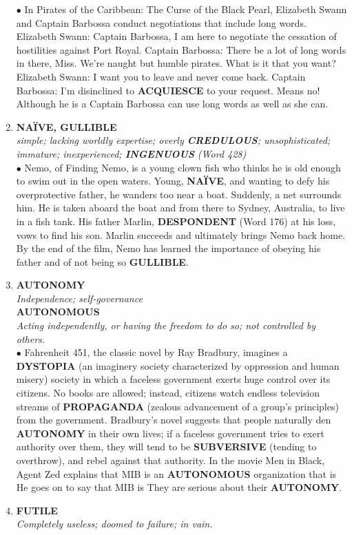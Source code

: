 \documentclass{book}
\begin{document}
\begin{enumerate}
$\bullet$ In Pirates of the Caribbean: The Curse of the Black Pearl, Elizabeth Swann and Captain Barbossa conduct negotiations that include long words. Elizabeth Swann: Captain Barbossa, I am here to negotiate the cessation of hostilities against Port Royal. Captain Barbossa: There be a lot of long words in there, Miss. We're naught but humble pirates. What is it that you want? Elizabeth Swann: I want you to leave and never come back. Captain Barbossa: I'm disinclined to \textbf{ACQUIESCE} to your request. Means no!  Although he is a  Captain Barbossa can use long words as well as she can.

\item \textbf{NAÏVE, GULLIBLE}\\ 
\textit{simple; lacking worldly expertise; overly \textbf{CREDULOUS}; unsophisticated; immature; inexperienced; \textbf{INGENUOUS} (Word 428)}\\  

$\bullet$ Nemo, of Finding Nemo, is a young clown fish who thinks he is old enough to swim out in the open waters. Young, \textbf{NAÏVE}, and wanting to defy his overprotective father, he wanders too near a boat. Suddenly, a net surrounds him. He is taken aboard the boat and from there to Sydney, Australia, to live in a fish tank. His father Marlin, \textbf{DESPONDENT} (Word 176) at his loss, vows to find his son. Marlin succeeds and ultimately brings Nemo back home. By the end of the film, Nemo has learned the importance of obeying his father and of not being so \textbf{GULLIBLE}.

\item \textbf{AUTONOMY}\\ \textit{Independence; self-governance} \\ \textbf{AUTONOMOUS}\\ \textit{Acting independently, or having the freedom to do so; not controlled by others.}\\ 

$\bullet$ Fahrenheit 451, the classic novel by Ray Bradbury, imagines a \textbf{DYSTOPIA} (an imaginery society characterized by oppression and human misery) society in which a faceless government exerts huge control over its citizens. No books are allowed; instead, citizens watch endless television streams of \textbf{PROPAGANDA} (zealous advancement of a group's principles) from the government. Bradbury's novel suggests that people naturally den \textbf{AUTONOMY} in their own lives; if a faceless government tries to exert authority over them, they will tend to be \textbf{SUBVERSIVE} (tending to overthrow), and rebel against that authority. In the movie Men in Black, Agent Zed explains that MIB is an \textbf{AUTONOMOUS} organization that is  He goes on to say that MIB is  They are serious about their \textbf{AUTONOMY}.
\item \textbf{FUTILE}\\ \textit{Completely useless; doomed to failure; in vain.}\\


\end{enumerate}
\end{document}
